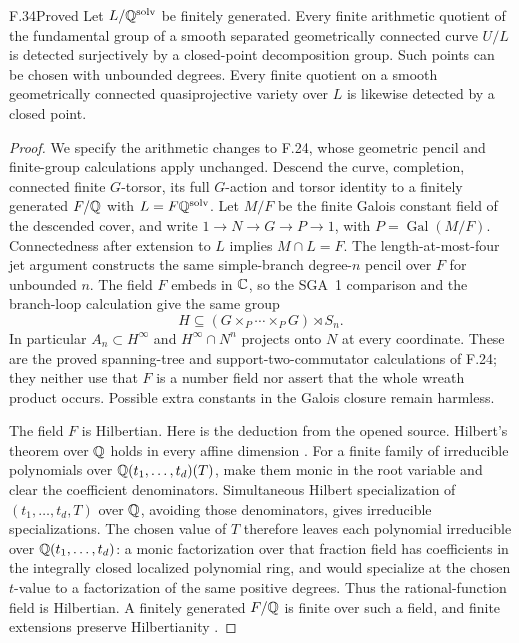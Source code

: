 \begin{claim}{F.34}{Proved}
Let $L/\mathbb Q^{\mathrm{solv}}$ be finitely generated. Every finite
arithmetic quotient of the fundamental group of a smooth
separated geometrically connected curve $U/L$ is detected
surjectively by a closed-point decomposition group. Such points
can be chosen with unbounded degrees. Every finite quotient
on a smooth geometrically connected quasiprojective variety over
$L$ is likewise detected by a closed point.
\end{claim}
\begin{proof}
We specify the arithmetic changes to F.24, whose geometric
pencil and finite-group calculations apply unchanged.
Descend the curve, completion, connected finite $G$-torsor,
its full $G$-action and torsor identity to a finitely generated
$F/\mathbb Q$ with $L=F\mathbb Q^{\mathrm{solv}}$. Let $M/F$ be the finite
Galois constant field of the descended cover, and write
$1\to N\to G\to P\to1$, with $P=\operatorname{Gal}(M/F)$.
Connectedness after extension to $L$ implies $M\cap L=F$.
The length-at-most-four jet argument constructs the same
simple-branch degree-$n$ pencil over $F$ for unbounded $n$.
The field $F$ embeds in $\mathbb C$, so the SGA~1 comparison and the
branch-loop calculation give the same group
\[
 H\subseteq(G\times_P\cdots\times_PG)\rtimes S_n.
\]
In particular $A_n\subset H^\infty$ and
$H^\infty\cap N^n$ projects onto $N$ at every coordinate.
These are the proved spanning-tree and support-two-commutator
calculations of F.24; they neither use that $F$ is a number
field nor assert that the whole wreath product occurs.
Possible extra constants in the Galois closure remain harmless.

The field $F$ is Hilbertian. Here is the deduction from the
opened source. Hilbert's theorem over $\mathbb Q$ holds in every
affine dimension \citep[Theorem~3.4.1]{F_Serre2007}.
For a finite family of irreducible polynomials over
$\mathbb Q(t_1,\ldots,t_d)(T)$, make them monic in the root variable
and clear the coefficient denominators. Simultaneous Hilbert
specialization of $(t_1,\ldots,t_d,T)$ over $\mathbb Q$, avoiding
those denominators, gives irreducible specializations.
The chosen value of $T$ therefore leaves each polynomial
irreducible over $\mathbb Q(t_1,\ldots,t_d)$: a monic factorization
over that fraction field has coefficients in the integrally
closed localized polynomial ring, and would specialize at the
chosen $t$-value to a factorization of the same positive degrees.
Thus the rational-function field is Hilbertian. A finitely
generated $F/\mathbb Q$ is finite over such a field, and finite
extensions preserve Hilbertianity
\citep[Corollary~3.2.2]{F_Serre2007}.


\end{proof}
